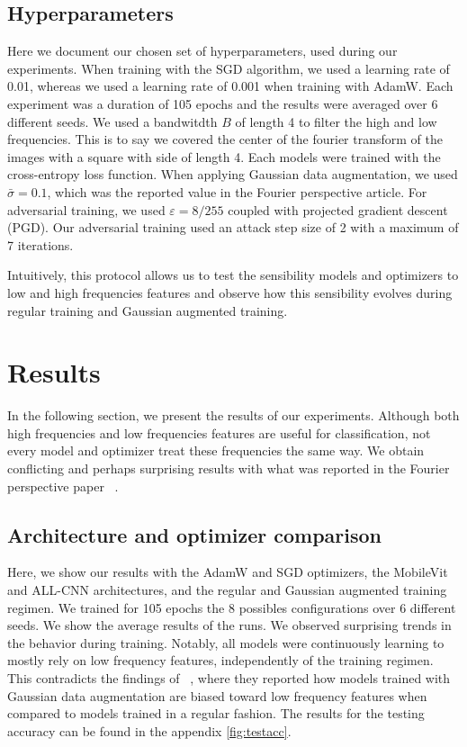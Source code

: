 \documentclass{article} \author{Simon Théorêt}
\begin{document}
\subsection*{Hyperparameters}
Here we document our chosen set of hyperparameters, used during our
experiments. When training with the SGD algorithm, we used a learning
rate of 0.01, whereas we used a learning rate of 0.001 when training
with AdamW. Each experiment was a duration of 105 epochs and the
results were averaged over 6 different seeds. We used a bandwitdth $B$
of length 4 to filter the high and low frequencies. This is to say we
covered the center of the fourier transform of the images with a
square with side of length 4. Each models were trained with the
cross-entropy loss function. When applying Gaussian data augmentation,
we used $\bar{\sigma} = 0.1$, which was the reported value in the
Fourier perspective article. For adversarial training, we used
$\varepsilon = 8/255$ coupled with projected gradient descent
(PGD). Our adversarial training used an attack step size of 2 with a
maximum of 7 iterations.

Intuitively, this protocol allows us to test the sensibility models
and optimizers to low and high frequencies features and observe how
this sensibility evolves during regular training and Gaussian
augmented training.

\section{Results}
In the following section, we present the results of our
experiments. Although both high frequencies and low frequencies
features are useful for classification, not every model and optimizer
treat these frequencies the same way. We obtain conflicting and
perhaps surprising results with what was reported in the Fourier
perspective paper ~\citep{yin2020fourier}.

\subsection{Architecture and optimizer comparison}
Here, we show our results with the AdamW and SGD optimizers, the
MobileVit and ALL-CNN architectures, and the regular and Gaussian
augmented training regimen.  We trained for 105 epochs the 8 possibles
configurations over 6 different seeds. We show the average results of
the runs.  We observed surprising trends in the behavior during
training. Notably, all models were continuously learning to mostly
rely on low frequency features, independently of the training
regimen. This contradicts the findings of ~\citep{yin2020fourier},
where they reported how models trained with Gaussian data augmentation
are biased toward low frequency features when compared to models
trained in a regular fashion. The results for the testing accuracy can
be found in the appendix \ref{fig:testacc}.
\end{document}
